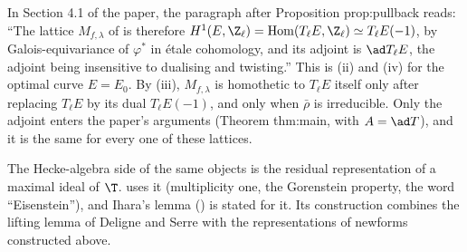 \begin{paperlink}
In Section 4.1 of the paper, the paragraph after Proposition prop:pullback reads: ``The lattice $M_{f,\lambda}$ of \cite{DFG04} is therefore
$H^1(E,\Z_\ell)=\operatorname{Hom}(T_\ell E,\Z_\ell)\simeq T_\ell E(-1)$, by Galois-equivariance of $\varphi^*$ in \'etale cohomology, and its adjoint is $\ad T_\ell E$, the adjoint
being insensitive to dualising and twisting.'' This is (ii) and (iv) for the optimal curve $E=E_0$. By (iii), $M_{f,\lambda}$ is homothetic to $T_\ell E$ itself only after replacing $T_\ell E$ by its dual
$T_\ell E(-1)$, and only when $\bar\rho$ is irreducible. Only the adjoint enters the paper's arguments (Theorem thm:main, with $A=\ad T$), and it is the same for
every one of these lattices.
\end{paperlink}

The Hecke-algebra side of the same objects is the residual representation of a maximal ideal of $\T$.  uses it (multiplicity one,
the Gorenstein property, the word ``Eisenstein''), and Ihara's lemma () is stated for it. Its construction combines the lifting
lemma of Deligne and Serre with the representations of newforms constructed above.

